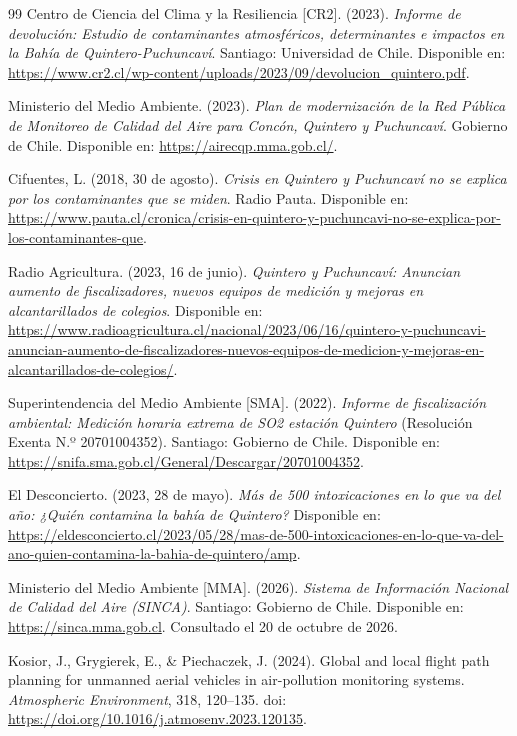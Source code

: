 \documentclass[letterpaper,12pt]{article}
\begin{document}
\begin{thebibliography}{99}
 Centro de Ciencia del Clima y la Resiliencia [CR2]. (2023). \textit{Informe de devolución: Estudio de contaminantes atmosféricos, determinantes e impactos en la Bahía de Quintero-Puchuncaví}. Santiago: Universidad de Chile. Disponible en: \url{https://www.cr2.cl/wp-content/uploads/2023/09/devolucion_quintero.pdf}.

 Ministerio del Medio Ambiente. (2023). \textit{Plan de modernización de la Red Pública de Monitoreo de Calidad del Aire para Concón, Quintero y Puchuncaví}. Gobierno de Chile. Disponible en: \url{https://airecqp.mma.gob.cl/}.

 Cifuentes, L. (2018, 30 de agosto). \textit{Crisis en Quintero y Puchuncaví no se explica por los contaminantes que se miden}. Radio Pauta. Disponible en: \url{https://www.pauta.cl/cronica/crisis-en-quintero-y-puchuncavi-no-se-explica-por-los-contaminantes-que}.

 Radio Agricultura. (2023, 16 de junio). \textit{Quintero y Puchuncaví: Anuncian aumento de fiscalizadores, nuevos equipos de medición y mejoras en alcantarillados de colegios}. Disponible en: \url{https://www.radioagricultura.cl/nacional/2023/06/16/quintero-y-puchuncavi-anuncian-aumento-de-fiscalizadores-nuevos-equipos-de-medicion-y-mejoras-en-alcantarillados-de-colegios/}.

 Superintendencia del Medio Ambiente [SMA]. (2022). \textit{Informe de fiscalización ambiental: Medición horaria extrema de SO2 estación Quintero} (Resolución Exenta N.º 20701004352). Santiago: Gobierno de Chile. Disponible en: \url{https://snifa.sma.gob.cl/General/Descargar/20701004352}.

 El Desconcierto. (2023, 28 de mayo). \textit{Más de 500 intoxicaciones en lo que va del año: ¿Quién contamina la bahía de Quintero?} Disponible en: \url{https://eldesconcierto.cl/2023/05/28/mas-de-500-intoxicaciones-en-lo-que-va-del-ano-quien-contamina-la-bahia-de-quintero/amp}.

 Ministerio del Medio Ambiente [MMA]. (2026). \textit{Sistema de Información Nacional de Calidad del Aire (SINCA)}. Santiago: Gobierno de Chile. Disponible en: \url{https://sinca.mma.gob.cl}. Consultado el 20 de octubre de 2026.

 Kosior, J., Grygierek, E., \& Piechaczek, J. (2024). Global and local flight path planning for unmanned aerial vehicles in air-pollution monitoring systems. \textit{Atmospheric Environment}, 318, 120--135. doi: \url{https://doi.org/10.1016/j.atmosenv.2023.120135}.


\end{thebibliography}
\end{document}
